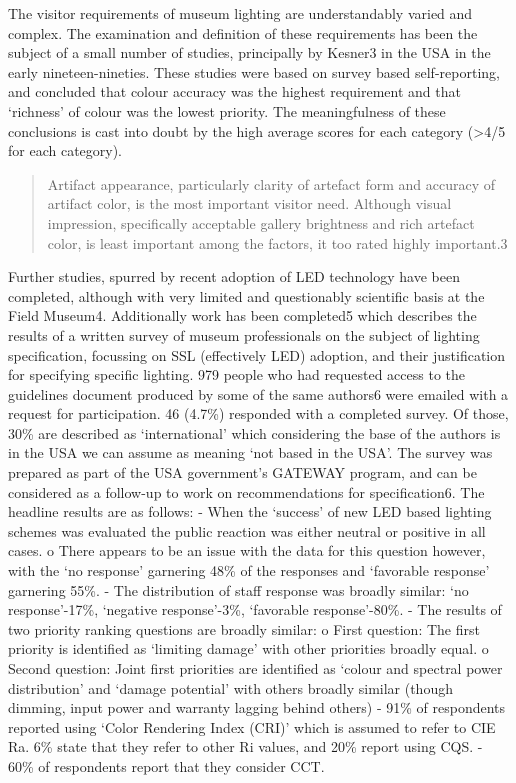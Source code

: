 The visitor requirements of museum lighting are understandably varied and complex. The examination and definition of these requirements has been the subject of a small number of studies, principally by Kesner3 in the USA in the early nineteen-nineties. These studies were based on survey based self-reporting, and concluded that colour accuracy was the highest requirement and that `richness' of colour was the lowest priority. The meaningfulness of these conclusions is cast into doubt by the high average scores for each category (>4/5 for each category).
\begin{quote}
Artifact appearance, particularly clarity of artefact form and accuracy of artifact color, is the most important visitor need. Although visual impression, specifically acceptable gallery brightness and rich artefact color, is least important among the factors, it too rated highly important.3
\end{quote}
Further studies, spurred by recent adoption of LED technology have been completed, although with very limited and questionably scientific basis at the Field Museum4.
Additionally work has been completed5 which describes the results of a written survey of museum professionals on the subject of lighting specification, focussing on SSL (effectively LED) adoption, and their justification for specifying specific lighting. 
979 people who had requested access to the guidelines document produced by some of the same authors6 were emailed with a request for participation. 46 (4.7\%) responded with a completed survey. Of those, 30\% are described as `international' which considering the base of the authors is in the USA we can assume as meaning `not based in the USA'. The survey was prepared as part of the USA government's GATEWAY program, and can be considered as a follow-up to work on recommendations for specification6. 
The headline results are as follows:
-	When the `success' of new LED based lighting schemes was evaluated the public reaction was either neutral or positive in all cases. 
o	There appears to be an issue with the data for this question however, with the `no response' garnering 48\% of the responses and `favorable response' garnering 55\%.
-	The distribution of staff response was broadly similar: `no response'-17\%, `negative response'-3\%, `favorable response'-80\%.
-	The results of two priority ranking questions  are broadly similar:
o	First question: The first priority is identified as `limiting damage' with other priorities broadly equal.
o	Second question: Joint first priorities are identified as `colour and spectral power distribution' and `damage potential' with others broadly similar (though dimming, input power and warranty lagging behind others)
-	91\% of respondents reported using `Color Rendering Index (CRI)' which is assumed to refer to CIE Ra. 6\% state that they refer to other Ri values, and 20\% report using CQS.
-	60\% of respondents report that they consider CCT.



